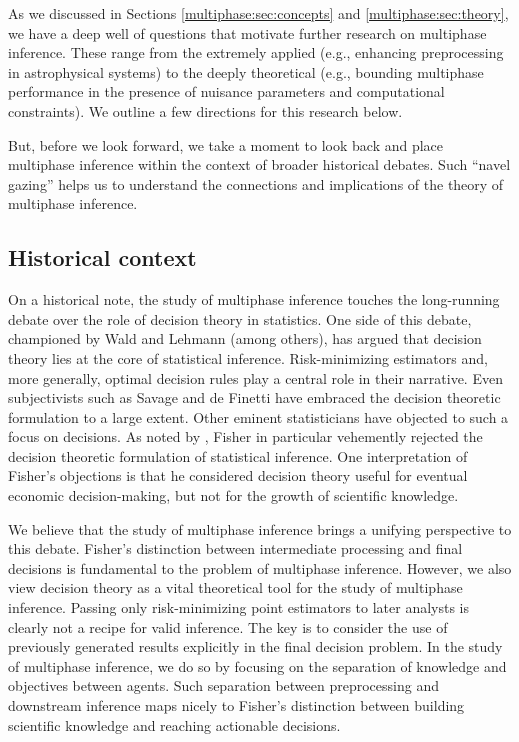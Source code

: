 As we discussed in Sections \ref{multiphase:sec:concepts} and \ref{multiphase:sec:theory}, we have a deep well of questions that motivate further research on multiphase inference.
These range from the extremely applied (e.g., enhancing preprocessing in astrophysical systems) to the deeply theoretical (e.g., bounding multiphase performance in the presence of nuisance parameters and computational constraints).
We outline a few directions for this research below.

But, before we look forward, we take a moment to look back and place multiphase inference within the context of broader historical debates.
Such ``navel gazing'' helps us to understand the connections and implications of the theory of multiphase inference.

\subsection{Historical context}

On a historical note, the study of multiphase inference touches the long-running debate over the role of decision theory in statistics.
One side of this debate, championed by Wald and Lehmann (among others), has argued that decision theory lies at the core of statistical inference.
Risk-minimizing estimators and, more generally, optimal decision rules play a central role in their narrative.
Even subjectivists such as Savage and de Finetti have embraced the decision theoretic formulation to a large extent.
Other eminent statisticians have objected to such a focus on decisions.
As noted by \citet{Savage1976}, Fisher in particular vehemently rejected the decision theoretic formulation of statistical inference.
One interpretation of Fisher's objections is that he considered decision theory useful for eventual economic decision-making, but not for the growth of scientific knowledge.
 
We believe that the study of multiphase inference brings a unifying perspective to this debate.
Fisher's distinction between intermediate processing and final decisions is fundamental to the problem of multiphase inference.
However, we also view decision theory as a vital theoretical tool for the study of multiphase inference.
Passing only risk-minimizing point estimators to later analysts is clearly not a recipe for valid inference.
The key is to consider the use of previously generated results explicitly in the final decision problem.
In the study of multiphase inference, we do so by focusing on the separation of knowledge and objectives between agents.
Such separation between preprocessing and downstream inference maps nicely to Fisher's distinction between building scientific knowledge and reaching actionable decisions.

